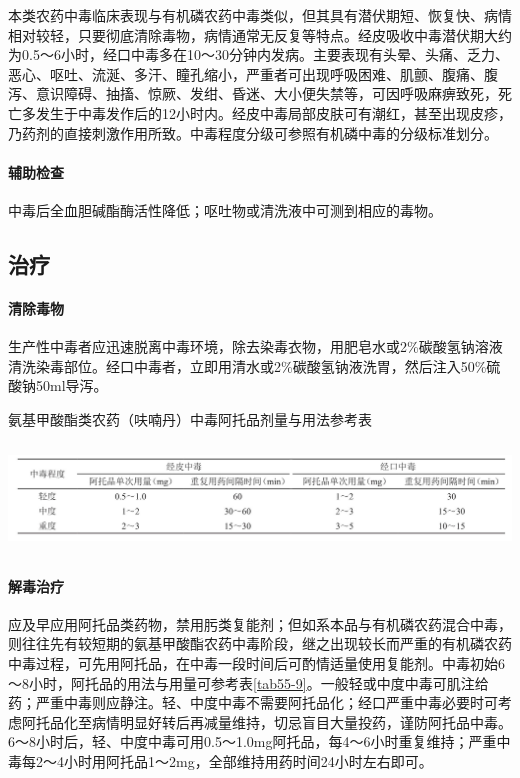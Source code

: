 本类农药中毒临床表现与有机磷农药中毒类似，但其具有潜伏期短、恢复快、病情相对较轻，只要彻底清除毒物，病情通常无反复等特点。经皮吸收中毒潜伏期大约为0.5～6小时，经口中毒多在10～30分钟内发病。主要表现有头晕、头痛、乏力、恶心、呕吐、流涎、多汗、瞳孔缩小，严重者可出现呼吸困难、肌颤、腹痛、腹泻、意识障碍、抽搐、惊厥、发绀、昏迷、大小便失禁等，可因呼吸麻痹致死，死亡多发生于中毒发作后的12小时内。经皮中毒局部皮肤可有潮红，甚至出现皮疹，乃药剂的直接刺激作用所致。中毒程度分级可参照有机磷中毒的分级标准划分。

\paragraph{辅助检查}

中毒后全血胆碱酯酶活性降低；呕吐物或清洗液中可测到相应的毒物。

\subsection{治疗}

\paragraph{清除毒物}

生产性中毒者应迅速脱离中毒环境，除去染毒衣物，用肥皂水或2\%碳酸氢钠溶液清洗染毒部位。经口中毒者，立即用清水或2\%碳酸氢钠液洗胃，然后注入50\%硫酸钠50ml导泻。

\begin{table}[htbp]
\centering
\caption{氨基甲酸酯类农药（呋喃丹）中毒阿托品剂量与用法参考表}
\label{tab55-9}
\includegraphics[width=6.66667in,height=1.13542in]{./images/Image00211.jpg}
\end{table}

\paragraph{解毒治疗}

应及早应用阿托品类药物，禁用肟类复能剂；但如系本品与有机磷农药混合中毒，则往往先有较短期的氨基甲酸酯农药中毒阶段，继之出现较长而严重的有机磷农药中毒过程，可先用阿托品，在中毒一段时间后可酌情适量使用复能剂。中毒初始6～8小时，阿托品的用法与用量可参考表\ref{tab55-9}。一般轻或中度中毒可肌注给药；严重中毒则应静注。轻、中度中毒不需要阿托品化；经口严重中毒必要时可考虑阿托品化至病情明显好转后再减量维持，切忌盲目大量投药，谨防阿托品中毒。6～8小时后，轻、中度中毒可用0.5～1.0mg阿托品，每4～6小时重复维持；严重中毒每2～4小时用阿托品1～2mg，全部维持用药时间24小时左右即可。

